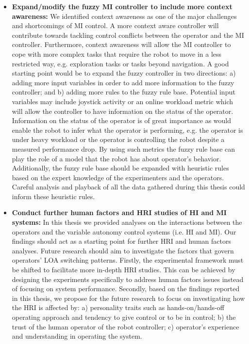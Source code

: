 \documentclass[a4paper,12pt,oneside,openright]{bhamthesis}
\begin{document}
\begin{itemize}
   
\item \textbf{Expand/modify the fuzzy MI controller to include more context awareness:} We identified context awareness as one of the major challenges and shortcomings of MI control. A more context aware controller will contribute towards tackling control conflicts between the operator and the MI controller. Furthermore, context awareness will allow the MI controller to cope with more complex tasks that require the robot to move in a less restricted way, e.g. exploration tasks or tasks beyond navigation. A good starting point would be to expand the fuzzy controller in two directions: a) adding more input variables in order to add more information to the fuzzy controller; and b) adding more rules to the fuzzy rule base. Potential input variables may include joystick activity or an online workload metric which will allow the controller to have information on the status of the operator. Information on the status of the operator is of great importance as would enable the robot to infer what the operator is performing, e.g. the operator is under heavy workload or the operator is controlling the robot despite a measured performance drop. By using such metrics the fuzzy rule base can play the role of a model that the robot has about operator's behavior. Additionally, the fuzzy rule base should be expanded with heuristic rules based on the expert knowledge of the experimenters and the operators. Careful analysis and playback of all the data gathered during this thesis could inform these heuristic rules.
    
 \item \textbf{Conduct further human factors and HRI studies of HI and MI systems:} In this thesis we provided analyses on the interactions between the operators and the variable autonomy control systems (i.e. HI and MI). Our findings should act as a starting point for further HRI and human factors analyses. Future research should aim to investigate the factors that govern operators' LOA switching patterns. Firstly, the experimental framework must be shifted to facilitate more in-depth HRI studies. This can be achieved by designing the experiments specifically to address human factors issues instead of focusing on system performance. Secondly, based on the findings reported in this thesis, we propose for the future research to focus on investigating how the HRI is affected by: a) personality traits such as hands-on/hands-off operating approach and tendency to give control or to be in control; b) the trust of the human operator of the robot controller; c) operator's experience and understanding in operating the system.  
 

\end{itemize}
\end{document}
